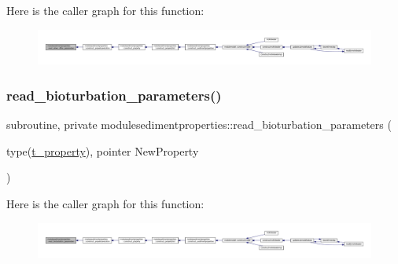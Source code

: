 Here is the caller graph for this function\+:\nopagebreak
\begin{figure}[H]
\begin{center}
\leavevmode
\includegraphics[width=350pt]{namespacemodulesedimentproperties_ae4b16a3890a8718b83545926394da139_icgraph}
\end{center}
\end{figure}
\mbox{\label{namespacemodulesedimentproperties_aa74dbe9c3eb52147100981fe4f5d8702}} 
\subsubsection{\texorpdfstring{read\+\_\+bioturbation\+\_\+parameters()}{read\_bioturbation\_parameters()}}
{\footnotesize\ttfamily subroutine, private modulesedimentproperties\+::read\+\_\+bioturbation\+\_\+parameters (\begin{DoxyParamCaption}\item[{type(\mbox{\hyperlink{structmodulesedimentproperties_1_1t__property}{t\+\_\+property}}), pointer}]{New\+Property }\end{DoxyParamCaption})\hspace{0.3cm}{\ttfamily [private]}}

Here is the caller graph for this function\+:\nopagebreak
\begin{figure}[H]
\begin{center}
\leavevmode
\includegraphics[width=350pt]{namespacemodulesedimentproperties_aa74dbe9c3eb52147100981fe4f5d8702_icgraph}
\end{center}
\end{figure}
\mbox{\label{namespacemodulesedimentproperties_a4e8f3da0b8583fb335570e3c3f8a4bb0}} 
